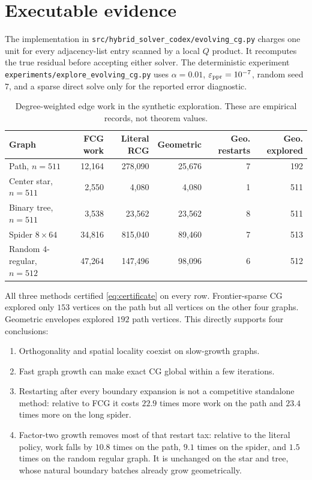 \documentclass[11pt]{article}
\begin{document}
\section{Executable evidence}
\label{sec:evidence}

The implementation in
\texttt{src/hybrid\_solver\_codex/evolving\_cg.py} charges one unit for every
adjacency-list entry scanned by a local $Q$ product. It recomputes the true
residual before accepting either solver. The deterministic experiment
\texttt{experiments/explore\_evolving\_cg.py} uses
$\alpha=0.01$, $\varepsilon_{\mathrm{ppr}}=10^{-7}$, random seed $7$, and a sparse direct solve
only for the reported error diagnostic.

\begin{table}[t]
\centering
\small
\caption{Degree-weighted edge work in the synthetic exploration. These are
empirical records, not theorem values.}
\label{tab:synthetic-work}
\begin{tabular}{lrrrrr}
\toprule
Graph & FCG work & Literal RCG & Geometric & Geo. restarts & Geo. explored \\
\midrule
Path, $n=511$               & 12,164 & 278,090 & 25,676 & 7 & 192 \\
Center star, $n=511$        &  2,550 &   4,080 &  4,080 & 1 & 511 \\
Binary tree, $n=511$        &  3,538 &  23,562 & 23,562 & 8 & 511 \\
Spider $8\times64$          & 34,816 & 815,040 & 89,460 & 7 & 513 \\
Random $4$-regular, $n=512$ & 47,264 & 147,496 & 98,096 & 6 & 512 \\
\bottomrule
\end{tabular}
\end{table}

All three methods certified \cref{eq:certificate} on every row.
Frontier-sparse CG explored only $153$ vertices on the path but all vertices
on the other four graphs. Geometric envelopes explored $192$ path vertices.
This directly supports four conclusions:
\begin{enumerate}[leftmargin=*]
 \item Orthogonality and spatial locality coexist on slow-growth graphs.
 \item Fast graph growth can make exact CG global within a few iterations.
 \item Restarting after every boundary expansion is not a competitive
 standalone method: relative to FCG it costs $22.9$ times more work on the
 path and $23.4$ times more on the long spider.
 \item Factor-two growth removes most of that restart tax: relative to the
 literal policy, work falls by $10.8$ times on the path, $9.1$ times on the
 spider, and $1.5$ times on the random regular graph. It is unchanged on the
 star and tree, whose natural boundary batches already grow geometrically.
\end{enumerate}
\end{document}
